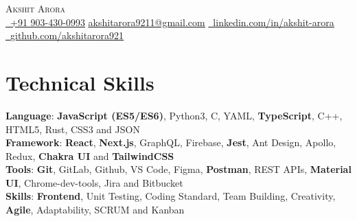 \documentclass[letterpaper,11pt]{article}
\begin{document}
\begin{center}
    {\Huge \scshape Akshit Arora}  \\ \vspace{1pt}
    \vspace{4pt}
    \small\href{tel:+91 9034300993}{\raisebox{-0.2\height}\ \underline{+91 903-430-0993}} \href{mailto:akshitarora9211@gmail.com}{ \underline{akshitarora9211@gmail.com}} 
    \href{https://www.linkedin.com/in/akshit-arora/}{\raisebox{-0.2\height}\ \underline{linkedin.com/in/akshit-arora}}  ~
    \href{https://github.com/akshitarora921}{\raisebox{-0.2\height}\ \underline{github.com/akshitarora921}}
    \vspace{-8pt}
\end{center}
\section{Technical Skills}
 \begin{itemize}[leftmargin=0.15in, label={}]
    \small{\item{
     \textbf{Language}{: \textbf{JavaScript (ES5/ES6)}, Python3, C, YAML, \textbf{TypeScript}, C++, HTML5,  Rust, CSS3 and JSON} \\
     \textbf{Framework}{:  \textbf{React}, \textbf{Next.js}, GraphQL, Firebase, \textbf{Jest}, Ant Design, Apollo, Redux, \textbf{Chakra UI} and \textbf{TailwindCSS} } \\
     \textbf{Tools}{: \textbf{Git}, GitLab, Github, VS Code, Figma, \textbf{Postman}, REST APIs, \textbf{Material UI}, Chrome-dev-tools, Jira and Bitbucket}\\
     \textbf{Skills}{: \textbf{Frontend}, Unit Testing, Coding Standard, Team Building, Creativity, \textbf{Agile}, Adaptability, SCRUM and Kanban}\\
    }}
 \end{itemize}
 \vspace{-16pt}
\end{document}
